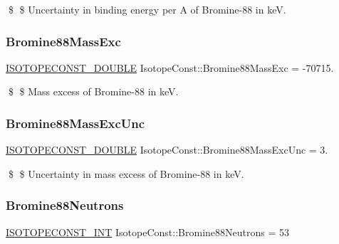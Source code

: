 \$ \$ Uncertainty in binding energy per A of Bromine-\/88 in keV. \mbox{\label{group___isotope_const-_bromine-_br88_gaffd4bf054c3efdb2edd5a20b53fe96c6}} 
\subsubsection{\texorpdfstring{Bromine88\+Mass\+Exc}{Bromine88MassExc}}
{\footnotesize\ttfamily \mbox{\hyperlink{group___isotope_const-_macros_ga8f45a7272ce02c0b4c65c44636ed719a}{I\+S\+O\+T\+O\+P\+E\+C\+O\+N\+S\+T\+\_\+\+D\+O\+U\+B\+LE}} Isotope\+Const\+::\+Bromine88\+Mass\+Exc = -\/70715.}

\$ \$ Mass excess of Bromine-\/88 in keV. \mbox{\label{group___isotope_const-_bromine-_br88_ga649e8e12981f80a6caa34743b7ece7ac}} 
\subsubsection{\texorpdfstring{Bromine88\+Mass\+Exc\+Unc}{Bromine88MassExcUnc}}
{\footnotesize\ttfamily \mbox{\hyperlink{group___isotope_const-_macros_ga8f45a7272ce02c0b4c65c44636ed719a}{I\+S\+O\+T\+O\+P\+E\+C\+O\+N\+S\+T\+\_\+\+D\+O\+U\+B\+LE}} Isotope\+Const\+::\+Bromine88\+Mass\+Exc\+Unc = 3.}

\$ \$ Uncertainty in mass excess of Bromine-\/88 in keV. \mbox{\label{group___isotope_const-_bromine-_br88_gaefa51710c17174a633107b71e42689e0}} 
\subsubsection{\texorpdfstring{Bromine88\+Neutrons}{Bromine88Neutrons}}
{\footnotesize\ttfamily \mbox{\hyperlink{group___isotope_const-_macros_ga5f18360b3e99483a35c32d789e62621c}{I\+S\+O\+T\+O\+P\+E\+C\+O\+N\+S\+T\+\_\+\+I\+NT}} Isotope\+Const\+::\+Bromine88\+Neutrons = 53}

